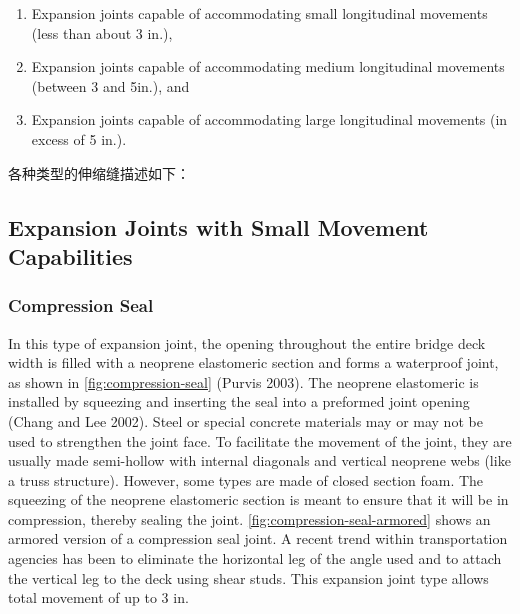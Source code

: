 \begin{enumerate}
  \item Expansion joints capable of accommodating small longitudinal movements (less than about 3 in.),
  \item Expansion joints capable of accommodating medium longitudinal movements (between 3 and 5in.), and
  \item Expansion joints capable of accommodating large longitudinal movements (in excess of 5 in.). 
\end{enumerate}

各种类型的伸缩缝描述如下：

\subsection{Expansion Joints with Small Movement Capabilities}
\subsubsection{Compression Seal}
In this type of expansion joint, the opening throughout the entire bridge deck width is filled with a neoprene
elastomeric section and forms a waterproof joint, as shown in \cref{fig:compression-seal} (Purvis 2003). The neoprene elastomeric is
installed by squeezing and inserting the seal into a preformed joint opening (Chang and Lee 2002). Steel or special
concrete materials may or may not be used to strengthen the joint face. To facilitate the movement of the joint, they
are usually made semi-hollow with internal diagonals and vertical neoprene webs (like a truss structure). However,
some types are made of closed section foam. The squeezing of the neoprene elastomeric section is meant to ensure
that it will be in compression, thereby sealing the joint. \cref{fig:compression-seal-armored} shows an armored version of a compression
seal joint. A recent trend within transportation agencies has been to eliminate the horizontal leg of the angle used and
to attach the vertical leg to the deck using shear studs. This expansion joint type allows total movement of up to 3 in.

